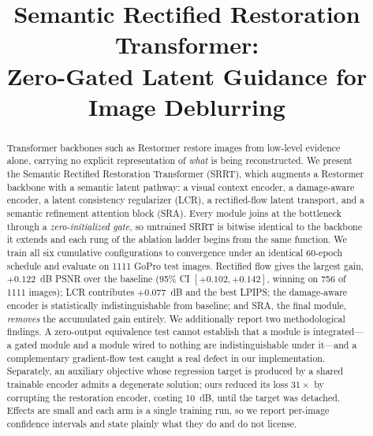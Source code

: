 \documentclass[conference]{IEEEtran}
\begin{document}
\title{Semantic Rectified Restoration Transformer:\\
Zero-Gated Latent Guidance for Image Deblurring}

\author{
\and
{}
}

\maketitle

\begin{abstract}
Transformer backbones such as Restormer restore images from low-level evidence
alone, carrying no explicit representation of \emph{what} is being
reconstructed. We present the Semantic Rectified Restoration Transformer
(SRRT), which augments a Restormer backbone with a semantic latent pathway: a
visual context encoder, a damage-aware encoder, a latent consistency
regularizer (LCR), a rectified-flow latent transport, and a semantic refinement
attention block (SRA). Every module joins at the bottleneck through a
\emph{zero-initialized gate}, so untrained SRRT is bitwise identical to the
backbone it extends and each rung of the ablation ladder begins from the same
function. We train all six cumulative configurations to convergence under an
identical 60-epoch schedule and evaluate on 1111 GoPro test images. Rectified
flow gives the largest gain, $+0.122$~dB PSNR over the baseline (95\% CI
$[+0.102,+0.142]$, winning on 756 of 1111 images); LCR contributes $+0.077$~dB
and the best LPIPS; the damage-aware encoder is statistically
indistinguishable from baseline; and SRA, the final module, \emph{removes} the
accumulated gain entirely. We additionally report two methodological findings.
A zero-output equivalence test cannot establish that a module is integrated---a
gated module and a module wired to nothing are indistinguishable under it---and
a complementary gradient-flow test caught a real defect in our implementation.
Separately, an auxiliary objective whose regression target is produced by a
shared trainable encoder admits a degenerate solution; ours reduced its loss
$31\times$ by corrupting the restoration encoder, costing 10~dB, until the
target was detached. Effects are small and each arm is a single training run,
so we report per-image confidence intervals and state plainly what they do and
do not license.
\end{abstract}
\end{document}

